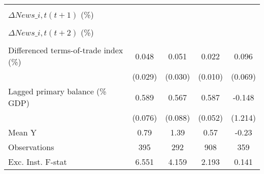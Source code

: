 {\begin{tabular}{l*{4}{c}}
                    &                     &                     &                     &                     \\
\addlinespace
$ \Delta News\_{i,t}(t+1)$ (\%)&                     &                     &                     &                     \\
                    &                     &                     &                     &                     \\
\addlinespace
$ \Delta News\_{i,t}(t+2)$ (\%)&                     &                     &                     &                     \\
                    &                     &                     &                     &                     \\
\addlinespace
Differenced terms-of-trade index (\%)&       0.048         &       0.051\sym{*}  &       0.022\sym{**} &       0.096         \\
                    &     (0.029)         &     (0.030)         &     (0.010)         &     (0.069)         \\
\addlinespace
Lagged primary balance (\% GDP)&       0.589\sym{***}&       0.567\sym{***}&       0.587\sym{***}&      -0.148         \\
                    &     (0.076)         &     (0.088)         &     (0.052)         &     (1.214)         \\
\midrule
Mean Y              &        0.79         &        1.39         &        0.57         &       -0.23         \\
Observations        &         395         &         292         &         908         &         359         \\
Exc. Inst. F-stat   &       6.551         &       4.159         &       2.193         &       0.141         \\
\bottomrule
\end{tabular}
}
